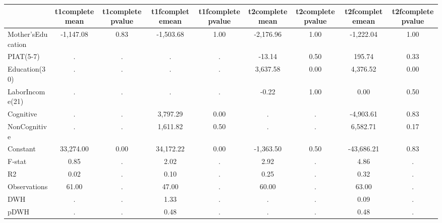 \begin{table}[htbp]
\begin{tabular}{lcccccccc} \hline \hline
 & t1completemean  & t1completepvalue  & t1fcompletemean  & t1fcompletepvalue  & t2completemean  & t2completepvalue  & t2fcompletemean  & t2fcompletepvalue  \\  \hline 
Mother'sEducation &    -1,147.08 &         0.83 &    -1,503.68 &         1.00 &    -2,176.96 &         1.00 &    -1,222.04 &         1.00 \\  
PIAT(5-7) &            . &            . &            . &            . &       -13.14 &         0.50 &       195.74 &         0.33 \\  
Education(30) &            . &            . &            . &            . &     3,637.58 &         0.00 &     4,376.52 &         0.00 \\  
LaborIncome(21) &            . &            . &            . &            . &        -0.22 &         1.00 &         0.00 &         0.50 \\  
Cognitive &            . &            . &     3,797.29 &         0.00 &            . &            . &    -4,903.61 &         0.83 \\  
NonCognitive &            . &            . &     1,611.82 &         0.50 &            . &            . &     6,582.71 &         0.17 \\  
Constant &    33,274.00 &         0.00 &    34,172.22 &         0.00 &    -1,363.50 &         0.50 &   -43,686.21 &         0.83 \\  
F-stat &         0.85 &            . &         2.02 &            . &         2.92 &            . &         4.86 &            . \\  
R2 &         0.02 &            . &         0.10 &            . &         0.25 &            . &         0.32 &            . \\  
Observations &        61.00 &            . &        47.00 &            . &        60.00 &            . &        63.00 &            . \\  
DWH &            . &            . &         1.33 &            . &            . &            . &         0.09 &            . \\  
pDWH &            . &            . &         0.48 &            . &            . &            . &         0.48 &            . \\  
\hline \hline \end{tabular}
\end{table}
